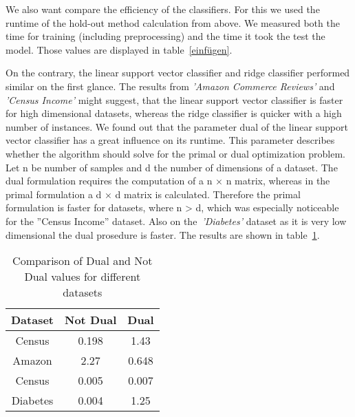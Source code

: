 \documentclass[a4paper,12pt]{article}
\begin{document}
We also want compare the efficiency of the classifiers. For this we used the runtime of the hold-out
method calculation from above. We measured both the time for training (including preprocessing) and
the time it took the test the model. Those values are displayed in table~\ref{einfügen}.




On the contrary, the linear support vector classifier and ridge classifier performed similar
on the first glance. The results from \textit{'Amazon Commerce Reviews'} and \textit{'Census Income'} might suggest,
that the linear support vector classifier is faster for high dimensional datasets, whereas the ridge classifier
is quicker with a high number of instances. We found out that the parameter dual of the linear support
vector classifier has a great influence on its runtime. This parameter describes whether the algorithm
should solve for the primal or dual optimization problem. Let n be number of samples and d the number
of dimensions of a dataset. The dual formulation requires the computation of a n × n matrix, whereas
in the primal formulation a d × d matrix is calculated. Therefore the primal formulation is faster for
datasets, where n > d, which was especially noticeable for the ”Census Income” dataset. Also on the~\textit{'Diabetes'}
dataset as it is very low dimensional the dual prosedure is faster. The results are shown in table~\ref{tab:dual_comparison}.

\begin{table}[h!]
\centering
\begin{tabular}{|c|c|c|}
\hline
\textbf{Dataset} & \textbf{Not Dual} & \textbf{Dual} \\
\hline
Census & 0.198 & 1.43 \\
\hline
Amazon & 2.27 & 0.648 \\
\hline
Census & 0.005 & 0.007 \\
\hline
Diabetes & 0.004 & 1.25 \\
\hline
\end{tabular}
\vspace{0.3cm}
\caption{Comparison of Dual and Not Dual values for different datasets}
\label{tab:dual_comparison}
\end{table}
\end{document}
